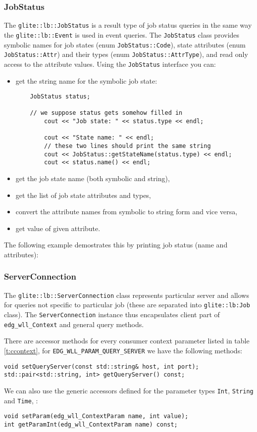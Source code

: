 \subsubsection{JobStatus}
The \verb'glite::lb::JobStatus' is a result type of job status
queries in the same way the \verb'glite::lb::Event' is used in event
queries. The \verb'JobStatus' class provides symbolic names for job
states (enum \verb'JobStatus::Code'), state attributes
(enum \verb'JobStatus::Attr') and their types (enum
\verb'JobStatus::AttrType'), and read only access to the
attribute values. Using the \verb'JobStatus' interface you can:
\begin{itemize}
\item get the string name for the symbolic job state:
\begin{lstlisting}
	JobStatus status;

	// we suppose status gets somehow filled in
        cout << "Job state: " << status.type << endl;

        cout << "State name: " << endl;
        // these two lines should print the same string
        cout << JobStatus::getStateName(status.type) << endl;
        cout << status.name() << endl;
\end{lstlisting}
\item get the job state name (both symbolic and string),
\item get the list of job state attributes and types,	
\item convert the attribute names from symbolic to string form and
vice versa,
\item get value of given attribute.
\end{itemize}
The following example demostrates this by printing job status (name
and attributes):


\subsubsection{ServerConnection}\label{s:ServerConnection}
The \verb'glite::lb::ServerConnection' class represents particular \LB
server and allows for queries not specific to particular job (these
are separated into \verb'glite::lb:Job' class). The
\verb'ServerConnection' instance thus encapsulates client part of
\verb'edg_wll_Context' and general query methods.

There are accessor methods for every consumer context parameter listed
in table \ref{t:ccontext}, \eg for \verb'EDG_WLL_PARAM_QUERY_SERVER'
we have the following methods:
\begin{lstlisting}
void setQueryServer(const std::string& host, int port);
std::pair<std::string, int> getQueryServer() const;
\end{lstlisting}
We can also use the generic accessors defined for the parameter types
\verb'Int', \verb'String' and \verb'Time', \eg:
\begin{lstlisting}
void setParam(edg_wll_ContextParam name, int value);
int getParamInt(edg_wll_ContextParam name) const;
\end{lstlisting}

